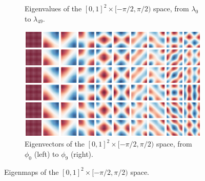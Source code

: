 \documentclass{article}
\begin{document}
\begin{figure}[h!]
    \centering
    \begin{subfigure}[b]{0.9\textwidth}
        \centering
        \caption{Eigenvalues of the $[0,1]^2 \times [-\pi/2, \pi/2)$ space, from $\lambda_0$ to $\lambda_{49}$.}
    \end{subfigure}
    \hfill
    \begin{subfigure}[b]{\textwidth}
        \centering
        \includegraphics[width=\textwidth]{Images/se2_eigenvecs.png}
        \caption{Eigenvectors of the $[0,1]^2 \times [-\pi/2, \pi/2)$ space, from $\phi_0$ (left) to $\phi_9$ (right).}
    \end{subfigure}
    \caption{Eigenmaps of the $[0,1]^2 \times [-\pi/2, \pi/2)$ space.}
    \label{fig:se2_eigenmaps}
\end{figure}
\end{document}
